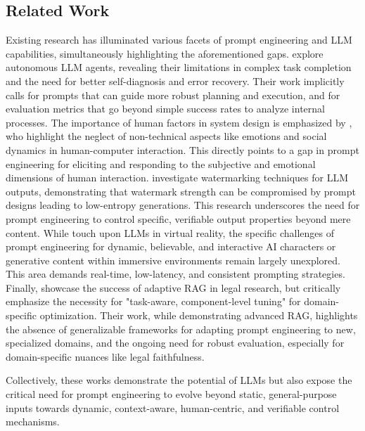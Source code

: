 \documentclass{article}
\begin{document}
\subsection{Related Work}
Existing research has illuminated various facets of prompt engineering and LLM capabilities, simultaneously highlighting the aforementioned gaps.
\citet{paper1} explore autonomous LLM agents, revealing their limitations in complex task completion and the need for better self-diagnosis and error recovery. Their work implicitly calls for prompts that can guide more robust planning and execution, and for evaluation metrics that go beyond simple success rates to analyze internal processes.
The importance of human factors in system design is emphasized by \citet{paper2}, who highlight the neglect of non-technical aspects like emotions and social dynamics in human-computer interaction. This directly points to a gap in prompt engineering for eliciting and responding to the subjective and emotional dimensions of human interaction.
\citet{paper3} investigate watermarking techniques for LLM outputs, demonstrating that watermark strength can be compromised by prompt designs leading to low-entropy generations. This research underscores the need for prompt engineering to control specific, verifiable output properties beyond mere content.
While \citet{paper4} touch upon LLMs in virtual reality, the specific challenges of prompt engineering for dynamic, believable, and interactive AI characters or generative content within immersive environments remain largely unexplored. This area demands real-time, low-latency, and consistent prompting strategies.
Finally, \citet{paper5} showcase the success of adaptive RAG in legal research, but critically emphasize the necessity for "task-aware, component-level tuning" for domain-specific optimization. Their work, while demonstrating advanced RAG, highlights the absence of generalizable frameworks for adapting prompt engineering to new, specialized domains, and the ongoing need for robust evaluation, especially for domain-specific nuances like legal faithfulness.

Collectively, these works demonstrate the potential of LLMs but also expose the critical need for prompt engineering to evolve beyond static, general-purpose inputs towards dynamic, context-aware, human-centric, and verifiable control mechanisms.
\end{document}
